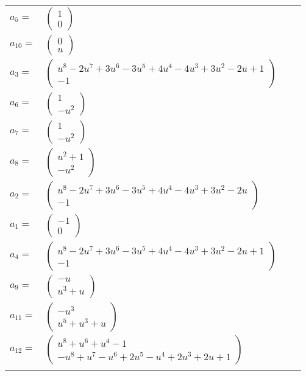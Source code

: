 \documentclass[1p]{elsarticle_modified}
\theoremstyle{definition}
\begin{document}
\begin{tabular}{m{7pt} m{180pt} m{7pt} m{180pt} }
\flushright $a_{5}=$&$\begin{pmatrix}1\\0\end{pmatrix}$ \\
\flushright $a_{10}=$&$\begin{pmatrix}0\\u\end{pmatrix}$ \\
\flushright $a_{3}=$&$\begin{pmatrix}u^8-2 u^7+3 u^6-3 u^5+4 u^4-4 u^3+3 u^2-2 u+1\\-1\end{pmatrix}$ \\
\flushright $a_{6}=$&$\begin{pmatrix}1\\- u^2\end{pmatrix}$ \\
\flushright $a_{7}=$&$\begin{pmatrix}1\\- u^2\end{pmatrix}$ \\
\flushright $a_{8}=$&$\begin{pmatrix}u^2+1\\- u^2\end{pmatrix}$ \\
\flushright $a_{2}=$&$\begin{pmatrix}u^8-2 u^7+3 u^6-3 u^5+4 u^4-4 u^3+3 u^2-2 u\\-1\end{pmatrix}$ \\
\flushright $a_{1}=$&$\begin{pmatrix}-1\\0\end{pmatrix}$ \\
\flushright $a_{4}=$&$\begin{pmatrix}u^8-2 u^7+3 u^6-3 u^5+4 u^4-4 u^3+3 u^2-2 u+1\\-1\end{pmatrix}$ \\
\flushright $a_{9}=$&$\begin{pmatrix}- u\\u^3+u\end{pmatrix}$ \\
\flushright $a_{11}=$&$\begin{pmatrix}- u^3\\u^5+u^3+u\end{pmatrix}$ \\
\flushright $a_{12}=$&$\begin{pmatrix}u^8+u^6+u^4-1\\- u^8+u^7- u^6+2 u^5- u^4+2 u^3+2 u+1\end{pmatrix}$\\&\end{tabular}
\end{document}
